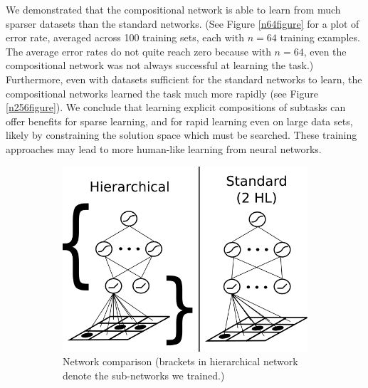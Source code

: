 \documentclass[10pt]{article}
\begin{document}
{We demonstrated that the compositional network is able to learn from much sparser datasets than the standard networks. (See Figure \ref{n64figure} for a plot of error rate, averaged across 100 training sets, each with $n = 64$ training examples. The average error rates do not quite reach zero because with $n = 64$, even the compositional network was not always successful at learning the task.) Furthermore, even with datasets sufficient for the standard networks to learn, the compositional networks learned the task much more rapidly (see Figure \ref{n256figure}). We conclude that learning explicit compositions of subtasks can offer benefits for sparse learning, and for rapid learning even on large data sets, likely by constraining the solution space which must be searched. These training approaches may lead to more human-like learning from neural networks.
\begin{figure}[H]
    \centering
    \begin{subfigure}[c]{0.35\textwidth}
	\centering
	\includegraphics[width=\textwidth]{figures/hierarchical_NN_abstract_figure.png}
	\caption{Network comparison (brackets in hierarchical network denote the sub-networks we trained.)}
	\label{networkdiagram}
    \end{subfigure}
    \begin{subfigure}[c]{0.3\textwidth}
	\centering

\end{subfigure}
\end{figure}}
\end{document}

